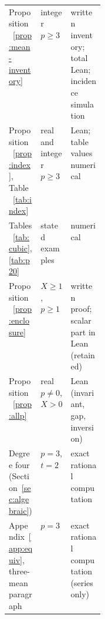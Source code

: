 \begin{table}[h]
\begin{tabularx}{\linewidth}{@{}l>{\raggedright\arraybackslash}p{0.19\linewidth}>{\raggedright\arraybackslash}X@{}}
Proposition~\ref{prop:mean-inventory} & integer $p\ge3$ & written inventory; total Lean; incidence simulation\\
Proposition~\ref{prop:index}, Table~\ref{tab:index} & real and integer $p\ge3$ & Lean; table values numerical\\
Tables~\ref{tab:cubic}, \ref{tab:p20} & stated examples & numerical\\
Proposition~\ref{prop:enclosure} & $X\ge1$, $p\ge1$ & written proof; scalar part in Lean (retained)\\
Proposition~\ref{prop:allp} & real $p\neq0$, $X>0$ & Lean (invariant, gap, inversion)\\
Degree four (Section~\ref{sec:algebraic}) & $p=3$, $t=2$ & exact rational computation\\
Appendix~\ref{app:equiv}, three-mean paragraph & $p=3$ & exact rational computation (series only)\\
\bottomrule
\end{tabularx}
\end{table}

